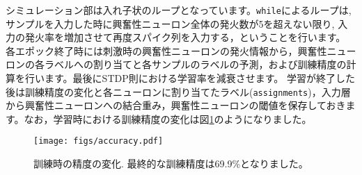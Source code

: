 シミュレーション部は入れ子状のループとなっています。\texttt{while}によるループは, サンプルを入力した時に興奮性ニューロン全体の発火数が5を超えない限り, 入力の発火率を増加させて再度スパイク列を入力する，ということを行います。
各エポック終了時には刺激時の興奮性ニューロンの発火情報から，興奮性ニューロンの各ラベルへの割り当てと各サンプルのラベルの予測，および訓練精度の計算を行います。最後にSTDP則における学習率を減衰させます。
学習が終了した後は訓練精度の変化と各ニューロンに割り当てたラベル(\texttt{assignments})，入力層から興奮性ニューロンへの結合重み，興奮性ニューロンの閾値を保存しておきます。なお，学習時における訓練精度の変化は図\ref{fig:MNISTaccuracy}のようになりました。
\begin{figure}[htbp]
    \centering
    \texttt{[image: figs/accuracy.pdf]}
    \caption{訓練時の精度の変化. 最終的な訓練精度は69.9\%となりました。}
    \label{fig:MNISTaccuracy}
\end{figure}

